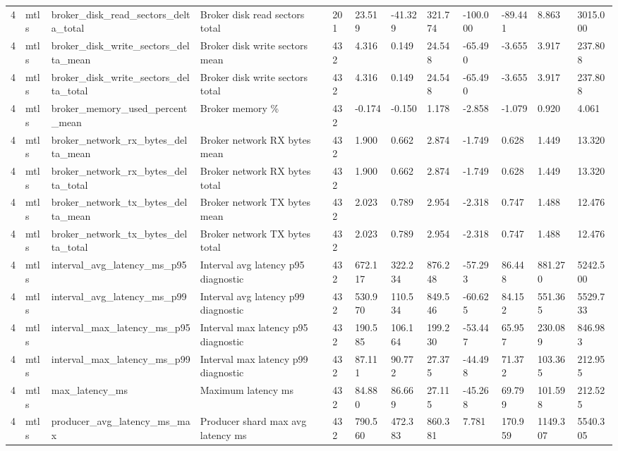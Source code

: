 \begin{longtable}{llllllllllll}
4 & mtls & broker\_disk\_read\_sectors\_delta\_total & Broker disk read sectors total & 201 & 23.519 & -41.329 & 321.774 & -100.000 & -89.441 & 8.863 & 3015.000 \\
4 & mtls & broker\_disk\_write\_sectors\_delta\_mean & Broker disk write sectors mean & 432 & 4.316 & 0.149 & 24.548 & -65.490 & -3.655 & 3.917 & 237.808 \\
4 & mtls & broker\_disk\_write\_sectors\_delta\_total & Broker disk write sectors total & 432 & 4.316 & 0.149 & 24.548 & -65.490 & -3.655 & 3.917 & 237.808 \\
4 & mtls & broker\_memory\_used\_percent\_mean & Broker memory \% & 432 & -0.174 & -0.150 & 1.178 & -2.858 & -1.079 & 0.920 & 4.061 \\
4 & mtls & broker\_network\_rx\_bytes\_delta\_mean & Broker network RX bytes mean & 432 & 1.900 & 0.662 & 2.874 & -1.749 & 0.628 & 1.449 & 13.320 \\
4 & mtls & broker\_network\_rx\_bytes\_delta\_total & Broker network RX bytes total & 432 & 1.900 & 0.662 & 2.874 & -1.749 & 0.628 & 1.449 & 13.320 \\
4 & mtls & broker\_network\_tx\_bytes\_delta\_mean & Broker network TX bytes mean & 432 & 2.023 & 0.789 & 2.954 & -2.318 & 0.747 & 1.488 & 12.476 \\
4 & mtls & broker\_network\_tx\_bytes\_delta\_total & Broker network TX bytes total & 432 & 2.023 & 0.789 & 2.954 & -2.318 & 0.747 & 1.488 & 12.476 \\
4 & mtls & interval\_avg\_latency\_ms\_p95 & Interval avg latency p95 diagnostic & 432 & 672.117 & 322.234 & 876.248 & -57.293 & 86.448 & 881.270 & 5242.500 \\
4 & mtls & interval\_avg\_latency\_ms\_p99 & Interval avg latency p99 diagnostic & 432 & 530.970 & 110.534 & 849.546 & -60.625 & 84.152 & 551.365 & 5529.733 \\
4 & mtls & interval\_max\_latency\_ms\_p95 & Interval max latency p95 diagnostic & 432 & 190.585 & 106.164 & 199.230 & -53.447 & 65.957 & 230.089 & 846.983 \\
4 & mtls & interval\_max\_latency\_ms\_p99 & Interval max latency p99 diagnostic & 432 & 87.111 & 90.772 & 27.375 & -44.498 & 71.372 & 103.365 & 212.955 \\
4 & mtls & max\_latency\_ms & Maximum latency ms & 432 & 84.880 & 86.669 & 27.115 & -45.268 & 69.799 & 101.598 & 212.525 \\
4 & mtls & producer\_avg\_latency\_ms\_max & Producer shard max avg latency ms & 432 & 790.560 & 472.383 & 860.381 & 7.781 & 170.959 & 1149.307 & 5540.305 \\

\end{longtable}
